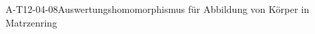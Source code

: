 
\begin{EXA}{A-T12-04-08}{Auswertungshomomorphismus für Abbildung von Körper in Matrzenring}
\end{EXA}
